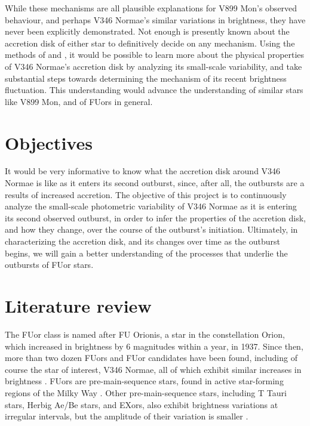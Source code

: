 \documentclass[iop,apj,tighten]{emulateapj}
\begin{document}
While these mechanisms are all plausible explanations for V899 Mon's observed behaviour, and perhaps V346 Normae's similar variations in brightness, they have never been explicitly demonstrated. Not enough is presently known about the accretion disk of either star to definitively decide on any mechanism. Using the methods of \cite{kenyon_flickering_2000} and \cite{siwak_photometric_2013}, it would be possible to learn more about the physical properties of V346 Normae's accretion disk by analyzing its small-scale variability, and take substantial steps towards determining the mechanism of its recent brightness fluctuation. This understanding would advance the understanding of similar stars like V899 Mon, and of FUors in general.

\section{Objectives}
It would be very informative to know what the accretion disk around V346 Normae is like as it enters its second outburst, since, after all, the outbursts are a results of increased accretion. The objective of this project is to continuously analyze the small-scale photometric variability of V346 Normae as it is entering its second observed outburst, in order to infer the properties of the accretion disk, and how they change, over the course of the outburst's initiation. Ultimately, in characterizing the accretion disk, and its changes over time as the outburst begins, we will gain a better understanding of the processes that underlie the outbursts of FUor stars.

\section{Literature review}
The FUor class is named after FU Orionis, a star in the constellation Orion, which increased in brightness by 6 magnitudes within a year, in 1937. Since then, more than two dozen FUors and FUor candidates have been found, including of course the star of interest, V346 Normae, all of which exhibit similar increases in brightness \citep{audard2014episodic}. FUors are pre-main-sequence stars, found in active star-forming regions of the Milky Way \citep{herbig1966interpretation,herbig_eruptive_1977,hartmann_fu_1996,kenyon_accretion_1999}. Other pre-main-sequence stars, including T Tauri stars, Herbig Ae/Be stars, and EXors, also exhibit brightness variations at irregular intervals, but the amplitude of their variation is smaller \citep{appenzeller1989t,herbig2008history,hillenbrand1992herbig}. 
\end{document}
